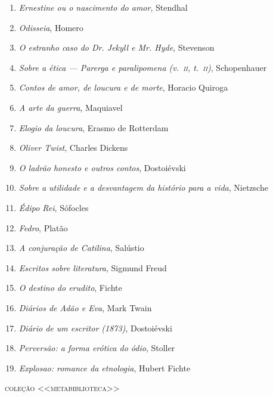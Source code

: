 \begin{enumerate}
\item \textit{Ernestine ou o nascimento do amor}, Stendhal
\item \textit{Odisseia}, Homero
\item \textit{O estranho caso do Dr. Jekyll e Mr. Hyde}, Stevenson
\item \textit{Sobre a ética --- Parerga e paralipomena (v.~\textsc{ii}, t.~\textsc{ii})}, Schopenhauer 
\item \textit{Contos de amor, de loucura e de morte}, Horacio Quiroga
\item \textit{A arte da guerra}, Maquiavel
\item \textit{Elogio da loucura}, Erasmo de Rotterdam
\item \textit{Oliver Twist}, Charles Dickens
\item \textit{O ladrão honesto e outros contos}, Dostoiévski
\item \textit{Sobre a utilidade e a desvantagem da histório para a vida}, Nietzsche
\item \textit{Édipo Rei}, Sófocles
\item \textit{Fedro}, Platão
\item \textit{A conjuração de Catilina}, Salústio
\item \textit{Escritos sobre literatura}, Sigmund Freud
\item \textit{O destino do erudito}, Fichte
\item \textit{Diários de Adão e Eva}, Mark Twain
\item \textit{Diário de um escritor (1873)}, Dostoiévski
\item \textit{Perversão: a forma erótica do ódio}, Stoller
\item \textit{Explosao: romance da etnologia}, Hubert Fichte
\end{enumerate}\medskip

{\large\textsc{coleção <<metabiblioteca>>}}\\

